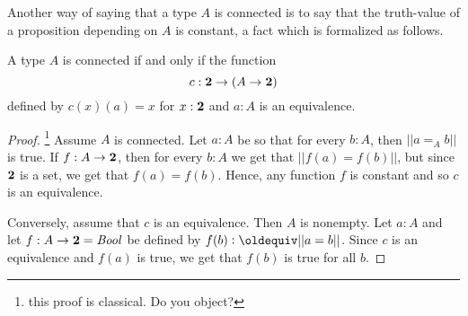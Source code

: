 Another way of saying that a type $A$ is connected is to say that the truth-value of a proposition depending on $A$ is constant, a fact which is formalized as follows.
\begin{lemma}
  A type $A$ is connected if and only if the function 
$$c:\mathbf{2} \to(A\to\mathbf{2} )$$ defined by $c(x)(a)=x$ for $x:\mathbf{2} $ and $a:A$ 
is an equivalence. 
\end{lemma}
  \begin{proof}\footnote{this proof is classical.  Do you object?}    
    Assume $A$ is connected.  Let $a:A$ be so that for every $b:A$, then $||a=_Ab||$ is true.  If $f:A\to\mathbf{2} $, then for every $b:A$ we get that $||f(a)=f(b)||$, but since $\mathbf{2} $ is a set, we get that $f(a)=f(b)$.  Hence, any function $f$ is constant and so $c$ is an equivalence.

Conversely, assume that $c$ is an equivalence.  Then $A$ is nonempty.  Let $a:A$ and let $f:A\to \mathbf{2} =\mathop{\mathit{Bool}}$ be defined by $f(b)\defequi||a=b||$.  Since $c$ is an equivalence and $f(a)$ is true, we get that $f(b)$ is true for all $b$.   
  \end{proof}

